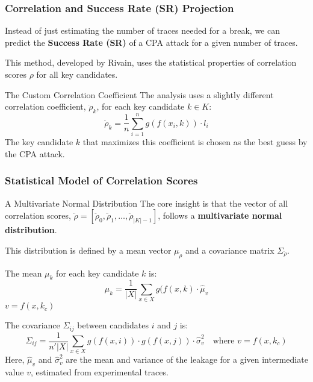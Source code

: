 

\begin{frame}
    \frametitle{Correlation and Success Rate (SR) Projection}

        Instead of just estimating the number of traces needed for a break, we can predict the \textbf{Success Rate (SR)} of a CPA attack for a given number of traces.
        
        This method, developed by Rivain, uses the statistical properties of correlation scores $\rho$ for all key candidates.
    
    \begin{block}{The Custom Correlation Coefficient}
        The analysis uses a slightly different correlation coefficient, $\ddot{\rho}_k$, for each key candidate $k \in K$:
        $$ \ddot{\rho}_k = \frac{1}{n} \sum_{i=1}^{n} g(f(x_i, k)) \cdot l_i $$
        The key candidate $k$ that maximizes this coefficient is chosen as the best guess by the CPA attack.
    \end{block}
\end{frame}

\begin{frame}
    \frametitle{Statistical Model of Correlation Scores}
    
    \begin{block}{A Multivariate Normal Distribution}
        The core insight is that the vector of all correlation scores, $\ddot{\rho} = [\ddot{\rho}_0, \ddot{\rho}_1, \dots, \ddot{\rho}_{|K|-1}]$, follows a \textbf{multivariate normal distribution}.
        
        This distribution is defined by a mean vector $\mu_{\ddot{\rho}}$ and a covariance matrix $\Sigma_{\ddot{\rho}}$.
    \end{block}
    
            The mean $\mu_k$ for each key candidate $k$ is:
        $$ \mu_k = \frac{1}{|X|} \sum_{x \in X} g(f(x, k) \cdot \hat{\mu}_v$$   $v = f(x, k_c)$ 
        
        The covariance $\Sigma_{ij}$ between candidates $i$ and $j$ is:
       $$ \Sigma_{ij} = \frac{1}{n'|X|} \sum_{x \in X} g(f(x, i)) \cdot g(f(x, j)) \cdot \hat{\sigma}^2_v \quad \text{where } v = f(x, k_c) $$
        Here, $\hat{\mu}_v$ and $\hat{\sigma}^2_v$ are the mean and variance of the leakage for a given intermediate value $v$, estimated from experimental traces.
\end{frame}

